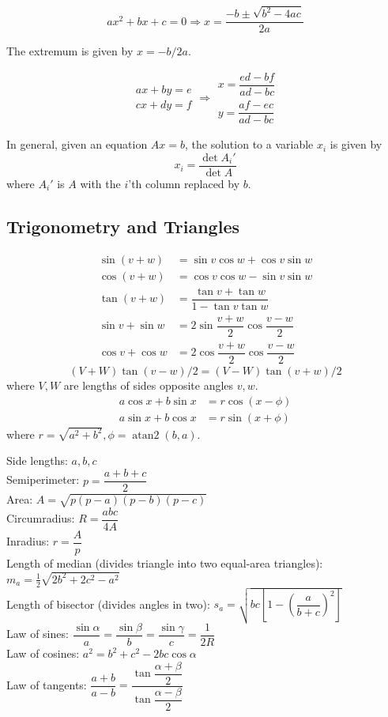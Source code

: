 
\[ax^2+bx+c=0 \Rightarrow x = \frac{-b\pm\sqrt{b^2-4ac}}{2a}\]

The extremum is given by $x = -b/2a$.

\[\begin{aligned}ax+by=e\\cx+dy=f\end{aligned}
\Rightarrow
\begin{aligned}x=\dfrac{ed-bf}{ad-bc}\\y=\dfrac{af-ec}{ad-bc}\end{aligned}\]

In general, given an equation $Ax = b$, the solution to a variable $x_i$ is given by
\[x_i = \frac{\det A_i'}{\det A} \]
where $A_i'$ is $A$ with the $i$'th column replaced by $b$.

\subsection{Trigonometry and Triangles}
\begin{align*}
\sin(v+w)&{}=\sin v\cos w+\cos v\sin w\\
\cos(v+w)&{}=\cos v\cos w-\sin v\sin w\\
\tan(v+w)&{}=\dfrac{\tan v+\tan w}{1-\tan v\tan w}\\
\sin v+\sin w&{}=2\sin\dfrac{v+w}{2}\cos\dfrac{v-w}{2}\\
\cos v+\cos w&{}=2\cos\dfrac{v+w}{2}\cos\dfrac{v-w}{2}
\end{align*}
\[ (V+W)\tan(v-w)/2{}=(V-W)\tan(v+w)/2 \]
where $V, W$ are lengths of sides opposite angles $v, w$.
\begin{align*}
	a\cos x+b\sin x&=r\cos(x-\phi)\\
	a\sin x+b\cos x&=r\sin(x+\phi)
\end{align*}
where $r=\sqrt{a^2+b^2}, \phi=\operatorname{atan2}(b,a)$.

Side lengths: $a,b,c$\\
Semiperimeter: $p=\dfrac{a+b+c}{2}$\\
Area: $A=\sqrt{p(p-a)(p-b)(p-c)}$\\
Circumradius: $R=\dfrac{abc}{4A}$\\
Inradius: $r=\dfrac{A}{p}$\\
Length of median (divides triangle into two equal-area triangles): $m_a=\tfrac{1}{2}\sqrt{2b^2+2c^2-a^2}$\\
Length of bisector (divides angles in two): $s_a=\sqrt{bc\left[1-\left(\dfrac{a}{b+c}\right)^2\right]}$\\
Law of sines: $\dfrac{\sin\alpha}{a}=\dfrac{\sin\beta}{b}=\dfrac{\sin\gamma}{c}=\dfrac{1}{2R}$\\
Law of cosines: $a^2=b^2+c^2-2bc\cos\alpha$\\
Law of tangents: $\dfrac{a+b}{a-b}=\dfrac{\tan\dfrac{\alpha+\beta}{2}}{\tan\dfrac{\alpha-\beta}{2}}$\\

